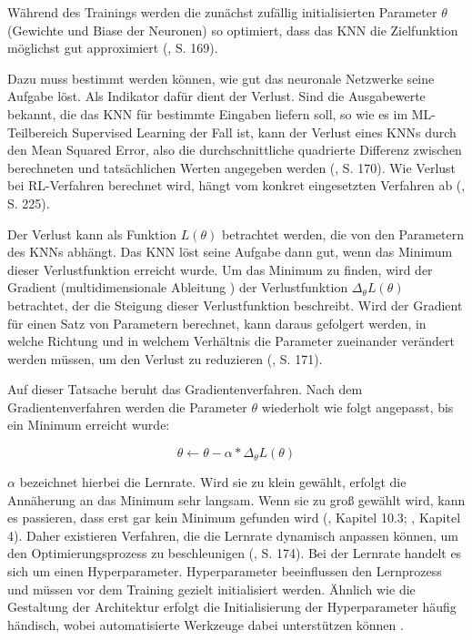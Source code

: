 Während des Trainings werden die zunächst zufällig initialisierten Parameter $\theta$ (Gewichte und Biase der Neuronen) so optimiert, dass das KNN die Zielfunktion möglichst gut approximiert (\cite{Albrecht.2024}, S. 169).

Dazu muss bestimmt werden können, wie gut das neuronale Netzwerke seine Aufgabe löst. Als Indikator dafür dient der Verlust. Sind die Ausgabewerte bekannt, die das KNN für bestimmte Eingaben liefern soll, so wie es im ML-Teilbereich Supervised Learning der Fall ist, kann der Verlust eines KNNs durch den Mean Squared Error, also die durchschnittliche quadrierte Differenz zwischen berechneten und tatsächlichen Werten angegeben werden (\cite{Albrecht.2024}, S. 170). Wie Verlust bei RL-Verfahren berechnet wird, hängt vom konkret eingesetzten Verfahren ab (\cite{Sutton.2018}, S. 225).

Der Verlust kann als Funktion $L(\theta)$ betrachtet werden, die von den Parametern des KNNs abhängt. Das KNN löst seine Aufgabe dann gut, wenn das Minimum dieser Verlustfunktion erreicht wurde. Um das Minimum zu finden, wird der Gradient (\glqq multidimensionale Ableitung \grqq{}) der Verlustfunktion $\Delta_\theta L(\theta)$ betrachtet, der die Steigung dieser Verlustfunktion beschreibt. Wird der Gradient für einen Satz von Parametern berechnet, kann daraus gefolgert werden, in welche Richtung und in welchem Verhältnis die Parameter zueinander verändert werden müssen, um den Verlust zu reduzieren (\cite{Albrecht.2024}, S. 171).

Auf dieser Tatsache beruht das Gradientenverfahren. Nach dem Gradientenverfahren werden die Parameter $\theta$ wiederholt wie folgt angepasst, bis ein Minimum erreicht wurde:

\[ \theta \leftarrow \theta {-} \alpha * \Delta_\theta L(\theta) \]

$\alpha$ bezeichnet hierbei die Lernrate. Wird sie zu klein gewählt, erfolgt die Annäherung an das Minimum sehr langsam. Wenn sie zu groß gewählt wird, kann es passieren, dass erst gar kein Minimum gefunden wird (\cite{Ferguson.January2019}, Kapitel 10.3; \cite{Buduma.2022}, Kapitel 4). Daher existieren Verfahren, die die Lernrate dynamisch anpassen können, um den Optimierungsprozess zu beschleunigen (\cite{Albrecht.2024}, S. 174). Bei der Lernrate handelt es sich um einen Hyperparameter. Hyperparameter beeinflussen den Lernprozess und müssen vor dem Training gezielt initialisiert werden. Ähnlich wie die Gestaltung der Architektur erfolgt die Initialisierung der Hyperparameter häufig händisch, wobei automatisierte Werkzeuge dabei unterstützen können \cite{Feurer.2019} \cite{Shawki.2021}.

